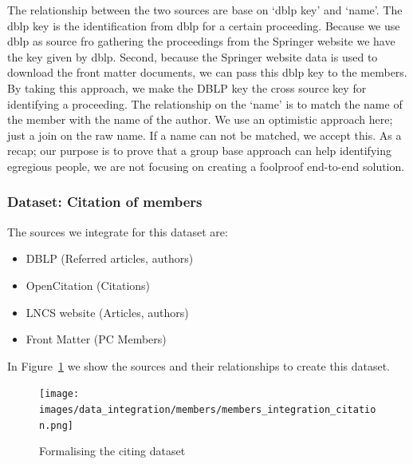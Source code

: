 \documentclass{ou-report}
\begin{document}
The relationship between the two sources are base on `dblp key' and `name'. 
The dblp key is the identification from dblp for a certain proceeding. Because we 
use dblp as source fro gathering the proceedings from the Springer website we 
have the key given by dblp. Second, because the Springer website data is used to 
download the front matter documents, we can pass this dblp key to the members.
By taking this approach, we make the DBLP key the cross source key for 
identifying a proceeding.
The relationship on the `name' is to match the name of the member with the name
of the author. We use an optimistic approach here; just a join on the raw name.
If a name can not be matched, we accept this. As a recap; our purpose is to prove
that a group base approach can help identifying egregious people, we are not 
focusing on creating a foolproof end-to-end solution.

\subsubsection{Dataset: Citation of members}

The sources we integrate for this dataset are:
\begin{itemize}
    \item DBLP (Referred articles, authors)
    \item OpenCitation (Citations)
    \item LNCS website (Articles, authors)
    \item Front Matter (PC Members)
\end{itemize}

In Figure~\ref{fig:members_integration_citation} we show the sources and their 
relationships to create this dataset.
\begin{figure}[H]
    \centering
    \texttt{[image: images/data\_integration/members/members\_integration\_citation.png]}
    \caption{Formalising the citing dataset}
    \label{fig:members_integration_citation}
\end{figure}
\end{document}
